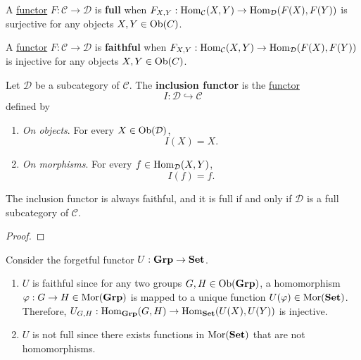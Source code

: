 	\begin{definition}
	  \label{def:full-functors}
		A \hyperref[def:functor]{functor} $F: \mathcal{C} \to \mathcal{D}$ is \textbf{full} when $F_{X, Y}: \operatorname{Hom}_{\mathcal{C}}(X, Y) \to \operatorname{Hom}_{\mathcal{D}} (F(X), F(Y))$ is surjective for any objects $X, Y \in \operatorname{Ob}(C)$. 
	\end{definition}

	\begin{definition}
	  \label{def:faithful-functor}
		A \hyperref[def:functor]{functor} $F: \mathcal{C} \to \mathcal{D}$ is \textbf{faithful} when $F_{X, Y}: \operatorname{Hom}_{\mathcal{C}}(X, Y) \to \operatorname{Hom}_{\mathcal{D}} (F(X), F(Y))$ is injective for any objects $X, Y \in \operatorname{Ob}(C)$. 
	\end{definition}

	\begin{definition}
	  \label{def:inclusion-functor}
		Let $\mathcal{D}$ be a subcategory of $\mathcal{C}$. The \textbf{inclusion functor} is the \hyperref[def:functor]{functor}
		\begin{equation}
			I: \mathcal D \hookrightarrow \mathcal C
		\end{equation}
		defined by
		\begin{enumerate}
			\item \textit{On objects}. For every $X \in \operatorname{Ob}(\mathcal D)$,
				\begin{equation}
					I(X) = X.
				\end{equation}
			\item \textit{On morphisms}. For every $f \in \operatorname{Hom}_{\mathcal D}(X,Y)$,
				\begin{equation}
					I(f) = f.
				\end{equation}
		\end{enumerate}
		The inclusion functor is always faithful, and it is full if and only if $\mathcal D$ is a full subcategory of $\mathcal C$.
	\end{definition}
	\begin{proof}
	  
	\end{proof}

	\begin{example}
	  \label{ex:faithfulness-of-the-forgetful-functor}
	  Consider the forgetful functor $U: \operatorname{\mathbf{Grp}} \to \operatorname{\mathbf{Set}}$. 
		\begin{enumerate}
			\item $U$ is faithful since for any two groups $G, H \in \operatorname{Ob}(\operatorname{\mathbf{Grp}})$, a homomorphism $\varphi: G \to H \in \operatorname{Mor}(\operatorname{\mathbf{Grp}})$ is mapped to a unique function $U(\varphi) \in \operatorname{Mor}(\operatorname{\mathbf{Set}})$. Therefore, $U_{G, H}: \operatorname{Hom}_{\operatorname{\mathbf{Grp}}} (G, H) \to \operatorname{Hom}_{\operatorname{\mathbf{Set}}}(U(X), U(Y))$ is injective. 
			\item $U$ is not full since there exists functions in $\operatorname{Mor}(\operatorname{\mathbf{Set}})$ that are not homomorphisms. 
		\end{enumerate}
	\end{example}

